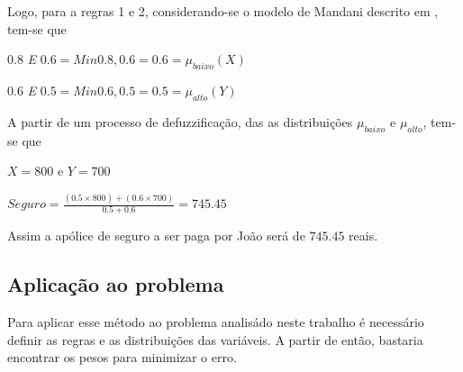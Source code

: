  Logo, para a regras 1 e 2, considerando-se o modelo de Mandani descrito em \cite{passos2005datamining}, tem-se que 
 \begin{description}
   \item $0.8$ \emph{E} $0.6 = Min{0.8,0.6} = 0.6 = \mu_{baixo}(X)$ 
   \item $0.6$ \emph{E} $0.5 = Min{0.6,0.5} = 0.5 = \mu_{alto}(Y)$
 \end{description}
 
 A partir de um processo de defuzzificação, das as distribuições $\mu_{baixo}$ e $\mu_{alto}$, tem-se que
 \begin{description}
   \item $X = 800$ e $Y=700$
   \item $Seguro = \frac{(0.5 \times 800)+(0.6 \times 700)}{0.5 + 0.6} = 745.45$
 \end{description}
 
 Assim a apólice de seguro a ser paga por João será de $745.45$ reais.

\subsection{Aplicação ao problema}

Para aplicar esse método ao problema analisádo neste trabalho é necessário definir as regras e as distribuições
das variáveis. A partir de então, bastaria encontrar os pesos para minimizar o erro.
